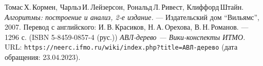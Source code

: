 \begin{thebibliography}{99}
Томас\,Х.\,Кормен, Чарльз\,И.\,Лейзерсон, Рональд\,Л.\,Ривест, Клиффорд\,Штайн.
{\itshape Алгоритмы: построение и анализ, 2-е издание.} --- Издательский дом \enquote{Вильямс}, 2007. Перевод с английского: И.\,В.\,Красиков, Н.\,А.\,Орехова, В.\,Н.\,Романов. --- 1296 с. (ISBN 5-8459-0857-4 (рус.))
{\itshape АВЛ-дерево — Вики-конспекты ИТМО.} \\URL: \texttt{https://neerc.ifmo.ru/wiki/index.php?title=АВЛ-дерево} (дата обращения: 23.04.2023).
\end{thebibliography}
\pagebreak
